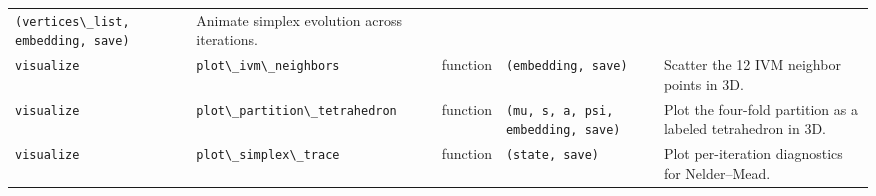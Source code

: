 \documentclass[
  10pt,
]{article}
\newcommand{\passthrough}[1]{#1}
\begin{document}
\begin{longtable}[]{@{}lllll@{}}
\begin{minipage}[t]{0.17\columnwidth}
\passthrough{\lstinline!(vertices\_list, embedding, save)!}\strut
\end{minipage} & \begin{minipage}[t]{0.17\columnwidth}\raggedright
Animate simplex evolution across iterations.\strut
\end{minipage}\tabularnewline
\begin{minipage}[t]{0.17\columnwidth}\raggedright
\passthrough{\lstinline!visualize!}\strut
\end{minipage} & \begin{minipage}[t]{0.17\columnwidth}\raggedright
\passthrough{\lstinline!plot\_ivm\_neighbors!}\strut
\end{minipage} & \begin{minipage}[t]{0.17\columnwidth}\raggedright
function\strut
\end{minipage} & \begin{minipage}[t]{0.17\columnwidth}\raggedright
\passthrough{\lstinline!(embedding, save)!}\strut
\end{minipage} & \begin{minipage}[t]{0.17\columnwidth}\raggedright
Scatter the 12 IVM neighbor points in 3D.\strut
\end{minipage}\tabularnewline
\begin{minipage}[t]{0.17\columnwidth}\raggedright
\passthrough{\lstinline!visualize!}\strut
\end{minipage} & \begin{minipage}[t]{0.17\columnwidth}\raggedright
\passthrough{\lstinline!plot\_partition\_tetrahedron!}\strut
\end{minipage} & \begin{minipage}[t]{0.17\columnwidth}\raggedright
function\strut
\end{minipage} & \begin{minipage}[t]{0.17\columnwidth}\raggedright
\passthrough{\lstinline!(mu, s, a, psi, embedding, save)!}\strut
\end{minipage} & \begin{minipage}[t]{0.17\columnwidth}\raggedright
Plot the four-fold partition as a labeled tetrahedron in 3D.\strut
\end{minipage}\tabularnewline
\begin{minipage}[t]{0.17\columnwidth}\raggedright
\passthrough{\lstinline!visualize!}\strut
\end{minipage} & \begin{minipage}[t]{0.17\columnwidth}\raggedright
\passthrough{\lstinline!plot\_simplex\_trace!}\strut
\end{minipage} & \begin{minipage}[t]{0.17\columnwidth}\raggedright
function\strut
\end{minipage} & \begin{minipage}[t]{0.17\columnwidth}\raggedright
\passthrough{\lstinline!(state, save)!}\strut
\end{minipage} & \begin{minipage}[t]{0.17\columnwidth}\raggedright
Plot per-iteration diagnostics for Nelder--Mead.\strut
\end{minipage}\tabularnewline
\bottomrule
\end{longtable}
\end{document}
